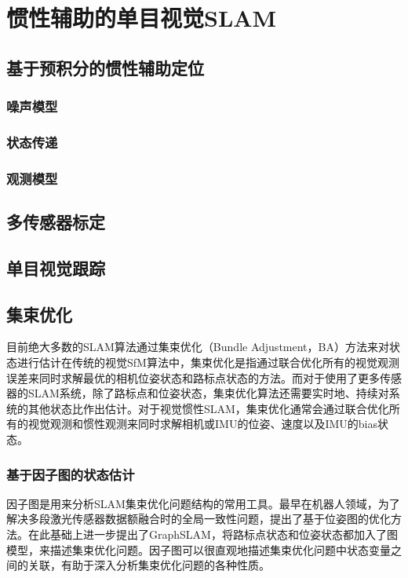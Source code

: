 \chapter{惯性辅助的单目视觉SLAM}

\section{基于预积分的惯性辅助定位}
\subsection{噪声模型}
\subsection{状态传递}
\subsection{观测模型}

\section{多传感器标定}

\section{单目视觉跟踪}

\section{集束优化}

目前绝大多数的SLAM算法通过集束优化\citep{triggs1999bundle}（Bundle Adjustment，BA）方法来对状态进行估计在传统的视觉SfM算法中，集束优化是指通过联合优化所有的视觉观测误差来同时求解最优的相机位姿状态和路标点状态的方法。而对于使用了更多传感器的SLAM系统，除了路标点和位姿状态，集束优化算法还需要实时地、持续对系统的其他状态比作出估计。对于视觉惯性SLAM，集束优化通常会通过联合优化所有的视觉观测和惯性观测来同时求解相机或IMU的位姿、速度以及IMU的bias状态。

\subsection{基于因子图的状态估计}

因子图是用来分析SLAM集束优化问题结构的常用工具。最早在机器人领域，为了解决多段激光传感器数据额融合时的全局一致性问题，\citep{lu1997globally,lu1997robot}提出了基于位姿图的优化方法。\citeauthor{thrun2006graph}在此基础上进一步提出了GraphSLAM\citep{thrun2006graph}，将路标点状态和位姿状态都加入了图模型，来描述集束优化问题。因子图可以很直观地描述集束优化问题中状态变量之间的关联，有助于深入分析集束优化问题的各种性质。

